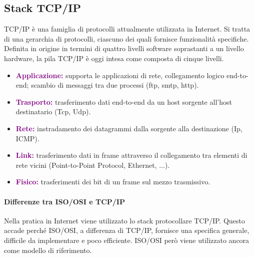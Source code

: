 \subsection{Stack TCP/IP}
TCP/IP è una famiglia di protocolli attualmente utilizzata in Internet. Si tratta di una gerarchia di protocolli, ciascuno dei quali fornisce funzionalità specifiche.
\newline Definita in origine in termini di quattro livelli software soprastanti a un livello hardware, la pila TCP/IP è oggi intesa come composta di cinque livelli.
\begin{itemize}
    \item \textbf{\textcolor{purple}{Applicazione:}} supporta le applicazioni di rete, collegamento logico end-to-end; scambio di messaggi tra due processi (ftp, smtp, http).
    \item \textbf{\textcolor{purple}{Trasporto:}} trasferimento dati end-to-end da un host sorgente all’host destinatario (Tcp, Udp).
    \item \textbf{\textcolor{purple}{Rete:}} instradamento dei datagrammi dalla sorgente alla destinazione (Ip, ICMP).
    \item \textbf{\textcolor{purple}{Link:}} trasferimento dati in frame attraverso il collegamento tra elementi di rete vicini (Point-to-Point Protocol, Ethernet, ...).
    \item \textbf{\textcolor{purple}{Fisico:}} trasferimenti dei bit di un frame sul mezzo trasmissivo.
\end{itemize}

\paragraph{Differenze tra ISO/OSI e TCP/IP} Nella pratica in Internet viene utilizzato lo stack protocollare TCP/IP. Questo accade perché ISO/OSI, a differenza di TCP/IP, fornisce una specifica generale, difficile da implementare e poco efficiente. ISO/OSI però viene utilizzato ancora come modello di riferimento.